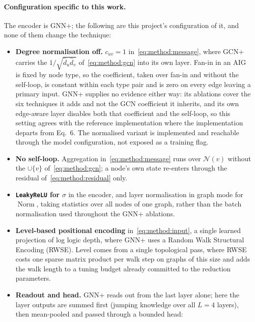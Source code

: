 \paragraph{Configuration specific to this work.}
The encoder is GNN+; the following are this project's configuration of it, and none of
them change the technique:
\begin{itemize}
    \item \textbf{Degree normalisation off.} $c_{uv} = 1$ in~\eqref{eq:method:message},
    where GCN+ carries the $1 / \sqrt{\hat{d}_u \hat{d}_v}$ of~\eqref{eq:method:gcn} into
    its own layer. Fan-in in an AIG is fixed by node type, so the coefficient, taken over
    fan-in and without the self-loop, is constant within each type pair and is zero on
    every edge leaving a primary input. GNN+ supplies no evidence either way: its
    ablations \citep[Tables~5--6]{luo2024gnnplus} cover the six techniques it adds and not
    the GCN coefficient it inherits, and its own edge-aware layer disables both that
    coefficient and the self-loop, so this setting agrees with the reference
    implementation where the implementation departs from Eq.~6. The normalised variant is
    implemented and reachable through the model
    configuration, not exposed as a training flag.
    \item \textbf{No self-loop.} Aggregation in~\eqref{eq:method:message} runs over
    $\mathcal{N}(v)$ without the $\cup \{v\}$ of~\eqref{eq:method:gcn}; a node's own
    state re-enters through the residual of~\eqref{eq:method:residual} only.
    \item \textbf{\texttt{LeakyReLU} for $\sigma$} in the encoder, and
    layer normalisation in graph mode for $\operatorname{Norm}$, taking statistics over all
    nodes of one graph, rather than the batch normalisation used throughout the GNN+
    ablations.
    \item \textbf{Level-based positional encoding} in~\eqref{eq:method:input}, a single
    learned projection of log logic depth, where GNN+ uses a Random Walk Structural
    Encoding (RWSE). Level comes from a single topological pass, where RWSE costs one
    sparse matrix product per walk step on graphs of this size and adds the walk length to
    a tuning budget already committed to the reduction parameters.
    \item \textbf{Readout and head.} GNN+ reads out from the last layer alone; here the
    layer outputs are summed first (jumping knowledge over all $L = 4$ layers), then
    mean-pooled and passed through a bounded head:
\end{itemize}
